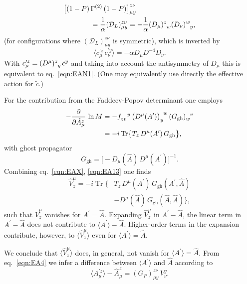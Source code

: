 \documentclass[twocolumn,aps,prd,amsmath,amssymb,preprintnumbers,longbibliography]{revtex4-1}
\numberwithin{equation}{section}
\DeclareMathOperator{\Tr}{Tr}
\newenvironment{alignedeqn}{\begin{equation}\begin{aligned}}{\end{aligned}\end{equation}\ignorespacesafterend}
\begin{document}
\begin{appendices}
\begin{alignedeqn}\label{eqn:EAN3}
	\bigl[(1 - P) \, &\Gamma^{(2)} \, (1 - P)\bigr]_{\mu y}^{z \nu}\\
	&= \frac{1}{\alpha} (\mathcal{D}_L)_{\mu y}^{z \nu}= -\frac{1}{\alpha} \tensor{(D_\mu)}{^z_w} \tensor{(D_\nu)}{^w_y},
\end{alignedeqn}
(for configurations where $(\mathcal{D}_L)_{\mu y}^{z \nu}$ is symmetric), which is inverted by
\begin{equation}\label{eqn:EAN4}
	\langle c_\mu^{\prime z} \, c_\nu^{\prime y}\rangle
	= -\alpha D_\mu D^{-4} D_\nu.
\end{equation}
With $c_\mu^{\prime z} = \tensor{(D^\mu)}{^z_y} \, \tilde{c}^y$ and taking into account the antisymmetry of $D_\mu$ this is equivalent to eq.~\eqref{eqn:EAN1}. (One may equivalently use directly the effective action for $\tilde{c}$.)

For the contribution from the Faddeev-Popov determinant one employs
\begin{alignedeqn}\label{eqn:EA13}
	-\frac{\partial}{\partial \hat{A}_\mu^z} \, \ln M
	&= -\tensor{f}{_z_v^y} \, \tensor{\bigl(D^\mu(A^\prime)\bigr)}{_y^w} \, \tensor{(G_\text{gh})}{_w^v}\\
	&= -i \Tr\bigl\{T_z \, D^\mu(A^\prime) \, G_\text{gh}\bigr\},
\end{alignedeqn}
with ghost propagator
\begin{equation}\label{eqn:EA14}
	G_\text{gh}
	= \bigl[-D_\mu(\hat{A}) \, D^\mu(A^\prime)\bigr]^{-1}.
\end{equation}
Combining eq.~\eqref{eqn:EAX}, \eqref{eqn:EA13} one finds
\begin{alignedeqn}\label{eqn:HH1}
	\hat{V}_z^\mu
	= -i \Tr\bigl\{&T_z \, D^\mu(A^\prime) \, G_\text{gh}(A^\prime,\hat{A})\\
	&- D^\mu(\hat{A}) \, G_\text{gh}(\hat{A},\hat{A})\bigr\},
\end{alignedeqn}
such that $\hat{V}_z^\mu$ vanishes for $A^\prime = \hat{A}$. Expanding $\hat{V}_z^\mu$ in $A^\prime - \hat{A}$, the linear term in $A^\prime - \hat{A}$ does not contribute to $\langle A^\prime\rangle - \hat{A}$. Higher-order terms in the expansion contribute, however, to $\langle\hat{V}_z^\mu\rangle$ even for $\langle A^\prime\rangle = \hat{A}$.

We conclude that $\langle\hat{V}_z^\mu\rangle$ does, in general, not vanish for $\langle A^\prime\rangle = \hat{A}$. From eq.~\eqref{eqn:EA4} we infer a difference between $\langle A^\prime\rangle$ and $\hat{A}$ according to
\begin{equation}\label{eqn:HH2}
	\langle A_\mu^{\prime z}\rangle - \hat{A}_\mu^z
	= (G_P)_{\mu y}^{z \nu} \, V_\nu^y.
\end{equation}





\end{appendices}
\end{document}
